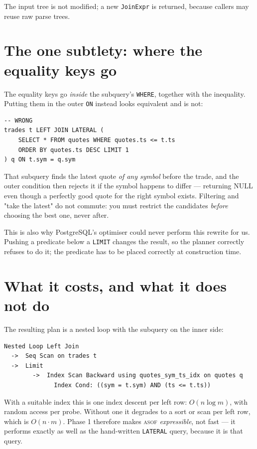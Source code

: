 \documentclass[11pt,a4paper]{article}
\newcommand{\code}[1]{\texttt{\small #1}}
\newcommand{\asof}{{\normalfont\scshape asof}}
\begin{document}
The input tree is not modified; a new \code{JoinExpr} is returned, because callers may reuse
raw parse trees.

\section{The one subtlety: where the equality keys go}

The equality keys go \emph{inside} the subquery's \code{WHERE}, together with the
inequality. Putting them in the outer \code{ON} instead looks equivalent and is not:

\begin{lstlisting}
-- WRONG
trades t LEFT JOIN LATERAL (
    SELECT * FROM quotes WHERE quotes.ts <= t.ts
    ORDER BY quotes.ts DESC LIMIT 1
) q ON t.sym = q.sym
\end{lstlisting}

That subquery finds the latest quote \emph{of any symbol} before the trade, and the outer
condition then rejects it if the symbol happens to differ — returning NULL even though a
perfectly good quote for the right symbol exists. Filtering and "take the latest" do not
commute: you must restrict the candidates \emph{before} choosing the best one, never after.

This is also why PostgreSQL's optimiser could never perform this rewrite for us. Pushing a
predicate below a \code{LIMIT} changes the result, so the planner correctly refuses to do
it; the predicate has to be placed correctly at construction time.

\section{What it costs, and what it does not do}

The resulting plan is a nested loop with the subquery on the inner side:

\begin{lstlisting}[style=sqlstyle]
Nested Loop Left Join
  ->  Seq Scan on trades t
  ->  Limit
        ->  Index Scan Backward using quotes_sym_ts_idx on quotes q
              Index Cond: ((sym = t.sym) AND (ts <= t.ts))
\end{lstlisting}

With a suitable index this is one index descent per left row: $O(n \log m)$, with random
access per probe. Without one it degrades to a sort or scan per left row, which is
$O(n \cdot m)$. Phase 1 therefore makes \asof{} \emph{expressible}, not fast — it performs
exactly as well as the hand-written \code{LATERAL} query, because it is that query.
\end{document}
